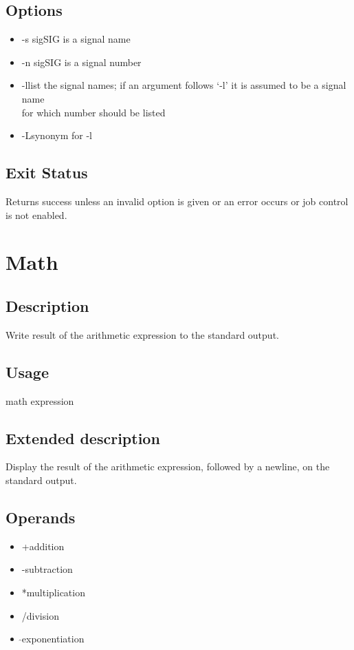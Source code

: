 \documentclass[12pt,a4paper]{report}
\begin{document}
\section{Options}
\begin{itemize}
	\item -s sig\hspace{7 mm}SIG is a signal name
	\item -n sig\hspace{7 mm}SIG is a signal number
	\item -l\hspace{14 mm}list the signal names; if an argument follows `-l' it is assumed to be a signal name\\
	\hspace*{17 mm}for which number should be listed
	\item -L\hspace{14 mm}synonym for -l
\end{itemize}
\section{Exit Status}
Returns success unless an invalid option is given or an error occurs or job control is not enabled.
\newpage

\chapter{Math}
\section{Description}
Write result of the arithmetic expression to the standard output.
\section{Usage}
math expression
\section{Extended description}
Display the result of the arithmetic expression, followed by a newline, on the standard output.
\section{Operands}
\begin{itemize}
	\item +\hspace{7 mm}addition
	\item -\hspace{7 mm}subtraction	
	\item *\hspace{7 mm}multiplication
	\item /\hspace{7 mm}division
	\item \hspace{2 mm}$\widehat{ }$\hspace{7 mm}exponentiation
\end{itemize}
\end{document}
